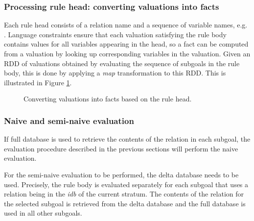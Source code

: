 \subsubsection{Processing rule head: converting valuations into facts}

Each rule head consists of a relation name and a sequence of variable names, e.g. . Language constraints ensure that each valuation satisfying the rule body contains values for all variables appearing in the head, so a fact can be computed from a valuation by looking up corresponding variables in the valuation. Given an RDD of valuations obtained by evaluating the sequence of subgoals in the rule body, this is done by applying a \emph{map} transformation to this RDD. This is illustrated in Figure \ref{graphevalrulehead}.


\begin{figure}[!ht]
\centering
{}
\caption{Converting valuations into facts based on the rule head.}\label{graphevalrulehead}
\end{figure}

\subsubsection{Naive and semi-naive evaluation}
If full database is used to retrieve the contents of the relation in each subgoal, the evaluation procedure described in the previous sections will perform the naive evaluation.

For the semi-naive evaluation to be performed, the delta database needs to be used. Precisely, the rule body is evaluated separately for each subgoal that uses a relation being in the \emph{idb} of the current stratum. The contents of the relation for the selected subgoal is retrieved from the delta database and the full database is used in all other subgoals.

